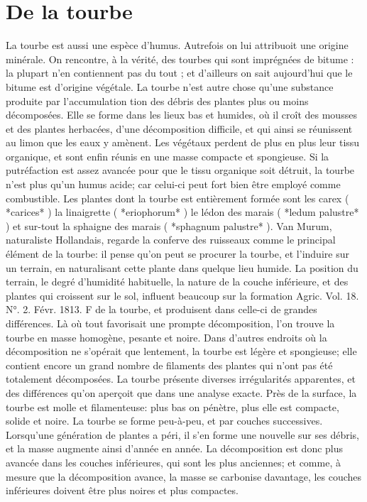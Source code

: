 \section{De la tourbe}
La tourbe est aussi une espèce d'humus. Autrefois on lui attribuoit une origine minérale. On rencontre, à la vérité, des tourbes qui sont imprégnées de bitume : la plupart n'en contiennent pas du tout ; et d'ailleurs on sait aujourd'hui que le bitume est d'origine végétale. La tourbe n'est autre chose qu'une substance produite par l'accumulation\setcounter{page}{73} tion des débris des plantes plus ou moins décomposées. Elle se forme dans les lieux bas et humides, où il croît des mousses et des plantes herbacées, d'une décomposition difficile, et qui ainsi se réunissent au limon que les eaux y amènent. Les végétaux perdent de plus en plus leur tissu organique, et sont enfin réunis en une masse compacte et spongieuse. Si la putréfaction est assez avancée pour que le tissu organique soit détruit, la tourbe n'est plus qu'un humus acide; car celui-ci peut fort bien être employé comme combustible. Les plantes dont la tourbe est entièrement formée sont les carex ( *carices* ) la linaigrette ( *eriophorum* ) le lédon des marais ( *ledum palustre* ) et sur-tout la sphaigne des marais ( *sphagnum palustre* ).
Van Murum, naturaliste Hollandais, regarde la conferve des ruisseaux comme le principal élément de la tourbe: il pense qu'on peut se procurer la tourbe, et l'induire sur un terrain, en naturalisant cette plante dans quelque lieu humide.
La position du terrain, le degré d'humidité habituelle, la nature de la couche inférieure, et des plantes qui croissent sur le sol, influent beaucoup sur la formation
Agric. Vol. 18. N°. 2. Févr. 1813. F\setcounter{page}{74} de la tourbe, et produisent dans celle-ci de grandes différences. Là où tout favorisait une prompte décomposition, l'on trouve la tourbe en masse homogène, pesante et noire. Dans d'autres endroits où la décomposition ne s'opérait que lentement, la tourbe est légère et spongieuse; elle contient encore un grand nombre de filaments des plantes qui n'ont pas été totalement décomposées. La tourbe présente diverses irrégularités apparentes, et des différences qu'on aperçoit que dans une analyse exacte. Près de la surface, la tourbe est molle et filamenteuse: plus bas on pénètre, plus elle est compacte, solide et noire. La tourbe se forme peu-à-peu, et par couches successives. Lorsqu'une génération de plantes a péri, il s'en forme une nouvelle sur ses débris, et la masse augmente ainsi d'année en année. La décomposition est donc plus avancée dans les couches inférieures, qui sont les plus anciennes; et comme, à mesure que la décomposition avance, la masse se carbonise davantage, les couches inférieures doivent être plus noires et plus compactes.
